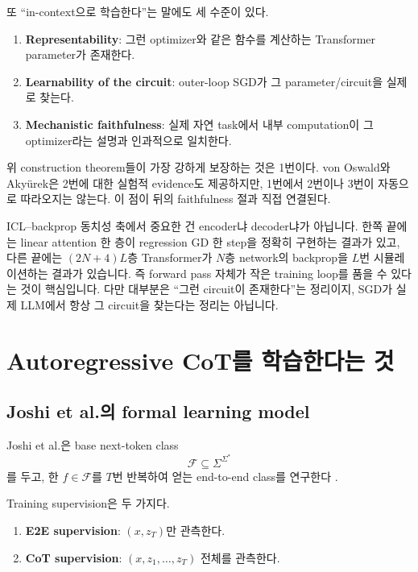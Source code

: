 \documentclass[11pt,a4paper,oneside,openany]{memoir}
\newcommand{\F}{\mathcal{F}}
\theoremstyle{definition}
\begin{document}
또 ``in-context으로 학습한다''는 말에도 세 수준이 있다.

\begin{enumerate}
\item \textbf{Representability}: 그런 optimizer와 같은 함수를 계산하는 Transformer parameter가 존재한다.
\item \textbf{Learnability of the circuit}: outer-loop SGD가 그 parameter/circuit을 실제로 찾는다.
\item \textbf{Mechanistic faithfulness}: 실제 자연 task에서 내부 computation이 그 optimizer라는 설명과 인과적으로 일치한다.
\end{enumerate}

위 construction theorem들이 가장 강하게 보장하는 것은 1번이다. von Oswald와 Aky\"urek은 2번에 대한 실험적 evidence도 제공하지만, 1번에서 2번이나 3번이 자동으로 따라오지는 않는다. 이 점이 뒤의 faithfulness 절과 직접 연결된다.

\begin{presentbox}
ICL--backprop 동치성 축에서 중요한 건 encoder냐 decoder냐가 아닙니다. 한쪽 끝에는 linear attention 한 층이 regression GD 한 step을 정확히 구현하는 결과가 있고, 다른 끝에는 $(2N+4)L$층 Transformer가 $N$층 network의 backprop을 $L$번 시뮬레이션하는 결과가 있습니다. 즉 forward pass 자체가 작은 training loop를 품을 수 있다는 것이 핵심입니다. 다만 대부분은 ``그런 circuit이 존재한다''는 정리이지, SGD가 실제 LLM에서 항상 그 circuit을 찾는다는 정리는 아닙니다.
\end{presentbox}

\chapter{Autoregressive CoT를 학습한다는 것}

\section{Joshi et al.의 formal learning model}

Joshi et al.은 base next-token class
\[
\F\subseteq \Sigma^{\Sigma^*}
\]
를 두고, 한 $f\in\F$를 $T$번 반복하여 얻는 end-to-end class를 연구한다 \cite{joshi2025}.

Training supervision은 두 가지다.

\begin{enumerate}
\item \textbf{E2E supervision}: $(x,z_T)$만 관측한다.
\item \textbf{CoT supervision}: $(x,z_1,\ldots,z_T)$ 전체를 관측한다.
\end{enumerate}
\end{document}
